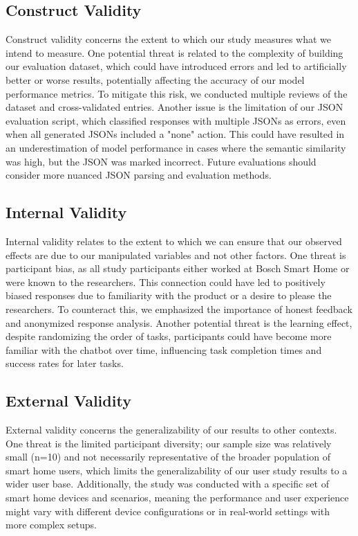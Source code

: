 \subsection{Construct Validity}

Construct validity concerns the extent to which our study measures what we intend to measure. One potential threat is related to the complexity of building our evaluation dataset, which could have introduced errors and led to artificially better or worse results, potentially affecting the accuracy of our model performance metrics. To mitigate this risk, we conducted multiple reviews of the dataset and cross-validated entries. Another issue is the limitation of our JSON evaluation script, which classified responses with multiple JSONs as errors, even when all generated JSONs included a "none" action. This could have resulted in an underestimation of model performance in cases where the semantic similarity was high, but the JSON was marked incorrect. Future evaluations should consider more nuanced JSON parsing and evaluation methods.

\subsection{Internal Validity}

Internal validity relates to the extent to which we can ensure that our observed effects are due to our manipulated variables and not other factors. One threat is participant bias, as all study participants either worked at Bosch Smart Home or were known to the researchers. This connection could have led to positively biased responses due to familiarity with the product or a desire to please the researchers. To counteract this, we emphasized the importance of honest feedback and anonymized response analysis. Another potential threat is the learning effect, despite randomizing the order of tasks, participants could have become more familiar with the chatbot over time, influencing task completion times and success rates for later tasks.

\subsection{External Validity}

External validity concerns the generalizability of our results to other contexts. One threat is the limited participant diversity; our sample size was relatively small (n=10) and not necessarily representative of the broader population of smart home users, which limits the generalizability of our user study results to a wider user base. Additionally, the study was conducted with a specific set of smart home devices and scenarios, meaning the performance and user experience might vary with different device configurations or in real-world settings with more complex setups.

